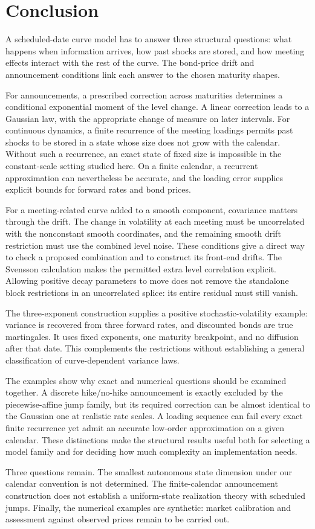 \section{Conclusion}
A scheduled-date curve model has to answer three structural questions: what happens when information arrives, how past shocks are stored, and how meeting effects interact with the rest of the curve. The bond-price drift and announcement conditions link each answer to the chosen maturity shapes.

For announcements, a prescribed correction across maturities determines a conditional exponential moment of the level change. A linear correction leads to a Gaussian law, with the appropriate change of measure on later intervals. For continuous dynamics, a finite recurrence of the meeting loadings permits past shocks to be stored in a state whose size does not grow with the calendar. Without such a recurrence, an exact state of fixed size is impossible in the constant-scale setting studied here. On a finite calendar, a recurrent approximation can nevertheless be accurate, and the loading error supplies explicit bounds for forward rates and bond prices.

For a meeting-related curve added to a smooth component, covariance matters through the drift. The change in volatility at each meeting must be uncorrelated with the nonconstant smooth coordinates, and the remaining smooth drift restriction must use the combined level noise. These conditions give a direct way to check a proposed combination and to construct its front-end drifts. The Svensson calculation makes the permitted extra level correlation explicit. Allowing positive decay parameters to move does not remove the standalone block restrictions in an uncorrelated splice: its entire residual must still vanish.

The three-exponent construction supplies a positive stochastic-volatility example: variance is recovered from three forward rates, and discounted bonds are true martingales. It uses fixed exponents, one maturity breakpoint, and no diffusion after that date. This complements the restrictions without establishing a general classification of curve-dependent variance laws.

The examples show why exact and numerical questions should be examined together. A discrete hike/no-hike announcement is exactly excluded by the piecewise-affine jump family, but its required correction can be almost identical to the Gaussian one at realistic rate scales. A loading sequence can fail every exact finite recurrence yet admit an accurate low-order approximation on a given calendar. These distinctions make the structural results useful both for selecting a model family and for deciding how much complexity an implementation needs.

Three questions remain. The smallest autonomous state dimension under our calendar convention is not determined. The finite-calendar announcement construction does not establish a uniform-state realization theory with scheduled jumps. Finally, the numerical examples are synthetic: market calibration and assessment against observed prices remain to be carried out.
